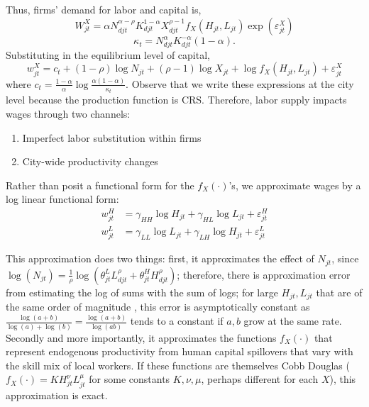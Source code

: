 \documentclass{article}
\begin{document}
Thus, firms' demand for labor and capital is,
$$W_{jt}^X = \alpha N_{djt}^{\alpha-\rho} K_{djt}^{1-\alpha} X_{djt}^{\rho-1}f_X(H_{jt},L_{jt})\exp(\varepsilon_{jt}^X)$$
$$\kappa_t = N_{djt}^\alpha K_{djt}^{-\alpha}(1-\alpha).$$
Substituting in the equilibrium level of capital,
\begin{equation}\label{eq_wage_eq}
    w_{jt}^X = c_t + (1-\rho)\log N_{jt} + (\rho-1)\log X_{jt} + \log f_X(H_{jt},L_{jt}) + \varepsilon_{jt}^X
\end{equation}
where $c_t = \frac{1-\alpha}{\alpha} \log \frac{\alpha(1-\alpha)}{\kappa_t}$. Observe that we write these expressions at the city level because the production function is CRS. 
Therefore, labor supply impacts wages through two channels:
\begin{enumerate}
    \item Imperfect labor substitution within firms
    \item City-wide productivity changes
\end{enumerate}
Rather than posit a functional form for the $f_{X}(\cdot)$'s, we approximate wages by a log linear functional form:
\begin{align}
    w_{jt}^H &= \gamma_{HH}\log H_{jt} + \gamma_{HL} \log L_{jt} + \varepsilon_{jt}^H \label{eq_wage_h_aprx} 
    \\ 
    w_{jt}^L &= \gamma_{LL}\log L_{jt} + \gamma_{LH} \log H_{jt} + \varepsilon_{jt}^L \label{eq_wage_l_aprx} 
\end{align}

This approximation does two things: first, it approximates the effect of $N_{jt}$, since $\log(N_{jt}) = \frac{1}{\rho}\log(\theta^L_{jt} L^\rho_{djt} + \theta^H_{jt} H^\rho_{djt})$; therefore, there is approximation error from estimating the log of sums with the sum of logs; for large $H_{jt}, L_{jt}$ that are of the same order of magnitude , this error is asymptotically constant as $\frac{\log(a+b)}{\log(a) + \log(b)} = \frac{\log(a + b)}{\log(ab )}$ tends to a constant if $a,b$ grow at the same rate. Secondly and more importantly, it approximates the functions $f_X(\cdot)$ that represent endogenous productivity from human capital spillovers that vary with the skill mix of local workers. If these functions are themselves Cobb Douglas ($f_X(\cdot) = K H_{jt}^\nu L_{jt}^\mu$ for some constants $K,\nu,\mu$, perhaps different for each $X$), this approximation is exact. 
\end{document}
